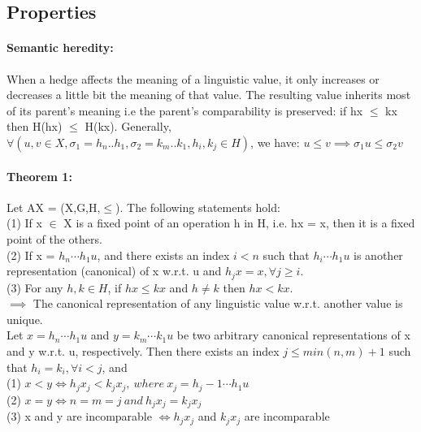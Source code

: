 \documentclass[part1.tex]{subfiles}
\begin{document}
\subsection{Properties}
\paragraph {Semantic heredity:} When a hedge affects the meaning of a linguistic value, it only
	increases or decreases a little bit the meaning of that value. The resulting value inherits
	most of its parent's meaning i.e the parent's comparability is preserved: 
	if hx \(\le\) kx then H(hx) \(\le\) H(kx). Generally, \(\forall (u,v \in X, 
	\sigma_1 = h_n..h_1, \sigma_2 = k_m..k_1, h_i,k_j \in H)\), we have:
	\(u \le v \implies \sigma_1u \le \sigma_2v\)\\
\paragraph {Theorem 1:} Let AX = (X,G,H,\(\le\)). The following statements hold:\\
\indent (1) If x \(\in\) X is a fixed point of an operation h in H, i.e. hx = x, then it is a fixed
	 point of the others.\\
\indent (2) If x = \(h_n \cdots h_1 u\), and there exists an index \(i<n\) such that \(h_i \cdots h_1 u\)        is another representation (canonical) of x w.r.t. u and \(h_j x = x, \forall j\ge i\).\\
\indent (3) For any \(h, k\in H\), if \(hx\le kx\) and \(h\neq k\) then \(hx< kx\).\\
\indent \(\implies\) The canonical representation of any linguistic value w.r.t. another value is unique.	\\
 Let \(x = h_n \cdots h_1 u\) and \(y = k_m \cdots k_1 u\) be two arbitrary
	canonical representations of x and y w.r.t. u, respectively. Then there exists an index
        \(j \le min(n, m) + 1\) such that \(h_i = k_i, \forall i < j\), and\\
\indent (1) \(x < y \iff h_j x_j < k_j x_j ,\: where \: x_j = h_j-1 \cdots h_1 u\)\\
\indent (2) \(x = y \iff n = m = j\: and\: h_j x_j = k_j x_j\)\\
\indent (3) x and y are incomparable \(\iff h_j x_j\) and \(k_j x_j\) are incomparable\\
\end{document}
